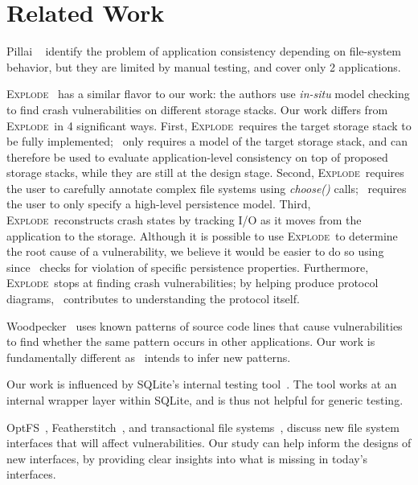 \section{Related Work}
\label{sec-related}

\newcommand{\EXPLODE}{\textsc{\fontsize{9.2}{5}\selectfont Explode}}
\newcommand{\STACK}{\textsc{\fontsize{9.2}{5}\selectfont Stack}}

Pillai \etal ~\cite{ThanuEtAl13-appconsistency-hotdep} identify the problem of
application consistency depending on file-system behavior, but they are limited
by manual testing, and cover only 2 applications.

\EXPLODE~\cite{YangEtAl06-Explode} has a similar flavor to our work: the
authors use \textit{in-situ} model checking to find crash vulnerabilities on
different storage stacks. Our work differs from \EXPLODE\ in 4 significant
ways. First, \EXPLODE\ requires the target storage stack to be fully
implemented; \toolname\ only requires a model of the target storage stack, and
can therefore be used to evaluate application-level consistency on top of
proposed storage stacks, while they are still at the design stage. Second,
\EXPLODE\ requires the user to carefully annotate complex file systems using
\textit{choose()} calls; \toolname\ requires the user to only specify a
high-level persistence model.  Third, \EXPLODE\ reconstructs crash states by
tracking I/O as it moves from the application to the storage.  Although it is
possible to use \EXPLODE\ to determine the root cause of a vulnerability, we
believe it would be easier to do so using \toolname\, since \toolname\ checks
for violation of specific persistence properties.  Furthermore, \EXPLODE\ stops
at finding crash vulnerabilities; by helping produce protocol diagrams,
\toolname\ contributes to understanding the protocol itself.

Woodpecker~\cite{cui2013verifying} uses known patterns of source code lines
that cause vulnerabilities to find whether the same pattern occurs in other
applications. Our work is fundamentally different as \toolname\ intends to
infer new patterns. 

Our work is influenced by SQLite's internal
testing tool~\cite{sqlite}. The tool works at an internal wrapper layer
within SQLite, and is thus not helpful for generic testing.

OptFS~\cite{Chidambaram+13-OptFS}, Featherstitch~\cite{Frost+07-GenFSDep}, and
transactional file systems~\cite{GallagherEtAl05-LogSkipPaper,
schmuck1991experience, fast09valor}, discuss new file system interfaces
that will affect vulnerabilities. Our study can help inform the designs of new
interfaces, by providing clear insights into what is missing in today's interfaces.
